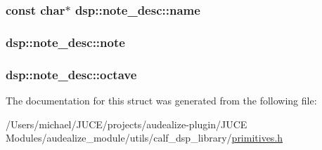 \subsubsection[{\texorpdfstring{name}{name}}]{\setlength{\rightskip}{0pt plus 5cm}const char$\ast$ dsp\+::note\+\_\+desc\+::name}\hypertarget{structdsp_1_1note__desc_a15af0c113deeaec3f7c67ad6377f1316}{}\label{structdsp_1_1note__desc_a15af0c113deeaec3f7c67ad6377f1316}
\subsubsection[{\texorpdfstring{note}{note}}]{ dsp\+::note\+\_\+desc\+::note}\hypertarget{structdsp_1_1note__desc_a84886c1623012754e704bccceff2bf77}{}\label{structdsp_1_1note__desc_a84886c1623012754e704bccceff2bf77}
\subsubsection[{\texorpdfstring{octave}{octave}}]{ dsp\+::note\+\_\+desc\+::octave}\hypertarget{structdsp_1_1note__desc_a6d055655b05fa2cdcf90e78a30707c9a}{}\label{structdsp_1_1note__desc_a6d055655b05fa2cdcf90e78a30707c9a}


The documentation for this struct was generated from the following file\+:\begin{DoxyCompactItemize}
\item 
/\+Users/michael/\+J\+U\+C\+E/projects/audealize-\/plugin/\+J\+U\+C\+E Modules/audealize\+\_\+module/utils/calf\+\_\+dsp\+\_\+library/\hyperlink{primitives_8h}{primitives.\+h}\end{DoxyCompactItemize}
